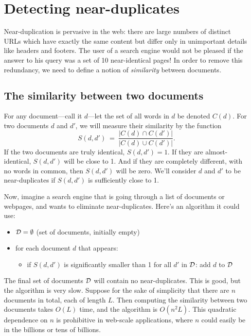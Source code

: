 \section{Detecting near-duplicates}

Near-duplication is pervasive in the web: there are large numbers of distinct URLs which have exactly
the same content but differ only in unimportant details like headers and footers. The user of a search
engine would not be pleased if the answer to his query was a set of 10 near-identical pages! In order
to remove this redundancy, we need to define a notion of {\it similarity} between documents.

\subsection{The similarity between two documents}

For any document---call it $d$---let the set of all words in $d$ be denoted $C(d)$. For two documents 
$d$ and $d'$, we will measure their similarity by the function
$$ S(d,d') \ = \ \frac{|C(d) \cap C(d')|}{|C(d) \cup C(d')|} .$$
If the two documents are truly identical, $S(d,d') = 1$. If they are almost-identical, $S(d,d')$ will
be close to 1. And if they are completely different, with no words in common, then $S(d,d')$ will be
zero. We'll consider $d$ and $d'$ to be near-duplicates if $S(d,d')$ is sufficiently close to 1.

Now, imagine a search engine that is going through a list of documents or webpages, and wants to 
eliminate near-duplicates. Here's an algorithm it could use:
\begin{itemize}
\item ${\cal D} = \emptyset$ (set of documents, initially empty)
\item for each document $d$ that appears:
\begin{itemize}
\item if $S(d,d')$ is significantly smaller than 1 for all $d'$ in ${\cal D}$: add $d$ to ${\cal D}$
\end{itemize}
\end{itemize}
The final set of documents ${\cal D}$ will contain no near-duplicates. This is good, but the
algorithm is very slow. Suppose for the sake of simplicity that there are $n$ documents in total,
each of length $L$. Then computing the similarity between two documents takes $O(L)$ time, and
the algorithm is $O(n^2L)$. This quadratic dependence on $n$ is prohibitive in web-scale applications,
where $n$ could easily be in the billions or tens of billions.

